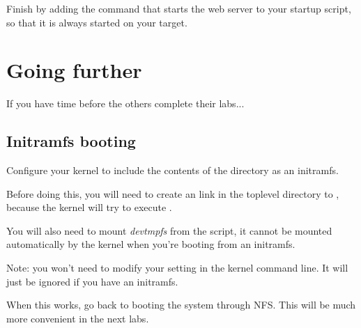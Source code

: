 Finish by adding the command that starts the web server to your
startup script, so that it is always started on your target.

\section{Going further}

If you have time before the others complete their labs...

\subsection{Initramfs booting}

Configure your kernel to include the contents of the 
directory as an initramfs.

Before doing this, you will need to create an  link in the
toplevel directory to , because the kernel will try to
execute .

You will also need to mount {\em devtmpfs} from the  script,
it cannot be mounted automatically by the kernel when you're booting
from an initramfs.

Note: you won't need to modify your  setting in the kernel
command line. It will just be ignored if you have an initramfs.

When this works, go back to booting the system through NFS.
This will be much more convenient in the next labs.

